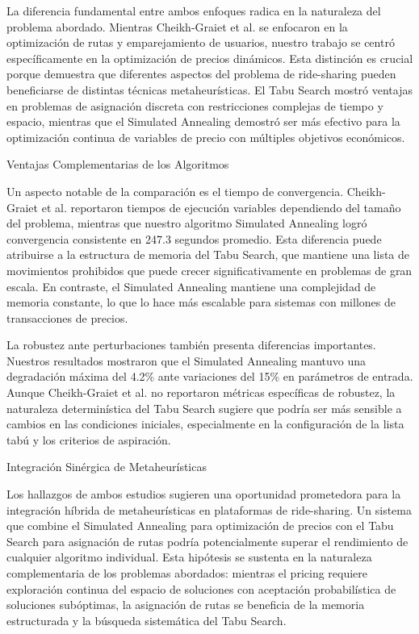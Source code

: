 \documentclass[conference]{IEEEtran}
\begin{document}
La diferencia fundamental entre ambos enfoques radica en la naturaleza del problema abordado. Mientras Cheikh-Graiet et al. se enfocaron en la optimización de rutas y emparejamiento de usuarios, nuestro trabajo se centró específicamente en la optimización de precios dinámicos. Esta distinción es crucial porque demuestra que diferentes aspectos del problema de ride-sharing pueden beneficiarse de distintas técnicas metaheurísticas. El Tabu Search mostró ventajas en problemas de asignación discreta con restricciones complejas de tiempo y espacio, mientras que el Simulated Annealing demostró ser más efectivo para la optimización continua de variables de precio con múltiples objetivos económicos.

Ventajas Complementarias de los Algoritmos

Un aspecto notable de la comparación es el tiempo de convergencia. Cheikh-Graiet et al. reportaron tiempos de ejecución variables dependiendo del tamaño del problema, mientras que nuestro algoritmo Simulated Annealing logró convergencia consistente en 247.3 segundos promedio. Esta diferencia puede atribuirse a la estructura de memoria del Tabu Search, que mantiene una lista de movimientos prohibidos que puede crecer significativamente en problemas de gran escala. En contraste, el Simulated Annealing mantiene una complejidad de memoria constante, lo que lo hace más escalable para sistemas con millones de transacciones de precios.

La robustez ante perturbaciones también presenta diferencias importantes. Nuestros resultados mostraron que el Simulated Annealing mantuvo una degradación máxima del 4.2\% ante variaciones del 15\% en parámetros de entrada. Aunque Cheikh-Graiet et al. no reportaron métricas específicas de robustez, la naturaleza determinística del Tabu Search sugiere que podría ser más sensible a cambios en las condiciones iniciales, especialmente en la configuración de la lista tabú y los criterios de aspiración.

Integración Sinérgica de Metaheurísticas

Los hallazgos de ambos estudios sugieren una oportunidad prometedora para la integración híbrida de metaheurísticas en plataformas de ride-sharing. Un sistema que combine el Simulated Annealing para optimización de precios con el Tabu Search para asignación de rutas podría potencialmente superar el rendimiento de cualquier algoritmo individual. Esta hipótesis se sustenta en la naturaleza complementaria de los problemas abordados: mientras el pricing requiere exploración continua del espacio de soluciones con aceptación probabilística de soluciones subóptimas, la asignación de rutas se beneficia de la memoria estructurada y la búsqueda sistemática del Tabu Search.
\end{document}

